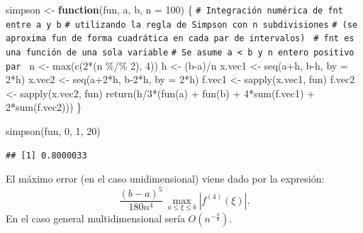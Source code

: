 \documentclass[
]{book}
\newenvironment{Shaded}{\begin{snugshade}}{\end{snugshade}}
\newcommand{\AttributeTok}[1]{\textcolor[rgb]{0.77,0.63,0.00}{#1}}
\newcommand{\CommentTok}[1]{\textcolor[rgb]{0.56,0.35,0.01}{\textit{#1}}}
\newcommand{\ControlFlowTok}[1]{\textcolor[rgb]{0.13,0.29,0.53}{\textbf{#1}}}
\newcommand{\DecValTok}[1]{\textcolor[rgb]{0.00,0.00,0.81}{#1}}
\newcommand{\FunctionTok}[1]{\textcolor[rgb]{0.00,0.00,0.00}{#1}}
\newcommand{\NormalTok}[1]{#1}
\newcommand{\OtherTok}[1]{\textcolor[rgb]{0.56,0.35,0.01}{#1}}
\newcommand{\SpecialCharTok}[1]{\textcolor[rgb]{0.00,0.00,0.00}{#1}}
\theoremstyle{break}
\theoremstyle{nonumberplain}
\renewcommand{\CommentTok}[1]{\textcolor[rgb]{0.41,0.41,0.41}{\texttt{#1}}}
\begin{document}
\begin{Shaded}
\begin{Highlighting}[]
\NormalTok{simpson }\OtherTok{\textless{}{-}} \ControlFlowTok{function}\NormalTok{(fun, a, b, }\AttributeTok{n =} \DecValTok{100}\NormalTok{) \{ }
\CommentTok{\# Integración numérica de fnt entre a y b}
\CommentTok{\# utilizando la regla de Simpson con n subdivisiones}
\CommentTok{\# (se aproxima fun de forma cuadrática en cada par de intervalos)  }
\CommentTok{\# fnt es una función de una sola variable}
\CommentTok{\# Se asume a \textless{} b y n entero positivo par }
\NormalTok{  n }\OtherTok{\textless{}{-}} \FunctionTok{max}\NormalTok{(}\FunctionTok{c}\NormalTok{(}\DecValTok{2}\SpecialCharTok{*}\NormalTok{(n }\SpecialCharTok{\%/\%} \DecValTok{2}\NormalTok{), }\DecValTok{4}\NormalTok{))}
\NormalTok{  h }\OtherTok{\textless{}{-}}\NormalTok{ (b}\SpecialCharTok{{-}}\NormalTok{a)}\SpecialCharTok{/}\NormalTok{n}
\NormalTok{  x.vec1 }\OtherTok{\textless{}{-}} \FunctionTok{seq}\NormalTok{(a}\SpecialCharTok{+}\NormalTok{h, b}\SpecialCharTok{{-}}\NormalTok{h, }\AttributeTok{by =} \DecValTok{2}\SpecialCharTok{*}\NormalTok{h)}
\NormalTok{  x.vec2 }\OtherTok{\textless{}{-}} \FunctionTok{seq}\NormalTok{(a}\SpecialCharTok{+}\DecValTok{2}\SpecialCharTok{*}\NormalTok{h, b}\DecValTok{{-}2}\SpecialCharTok{*}\NormalTok{h, }\AttributeTok{by =} \DecValTok{2}\SpecialCharTok{*}\NormalTok{h)}
\NormalTok{  f.vec1 }\OtherTok{\textless{}{-}} \FunctionTok{sapply}\NormalTok{(x.vec1, fun)}
\NormalTok{  f.vec2 }\OtherTok{\textless{}{-}} \FunctionTok{sapply}\NormalTok{(x.vec2, fun)}
  \FunctionTok{return}\NormalTok{(h}\SpecialCharTok{/}\DecValTok{3}\SpecialCharTok{*}\NormalTok{(}\FunctionTok{fun}\NormalTok{(a) }\SpecialCharTok{+} \FunctionTok{fun}\NormalTok{(b) }\SpecialCharTok{+} \DecValTok{4}\SpecialCharTok{*}\FunctionTok{sum}\NormalTok{(f.vec1) }\SpecialCharTok{+} \DecValTok{2}\SpecialCharTok{*}\FunctionTok{sum}\NormalTok{(f.vec2)))}
\NormalTok{\}}

\FunctionTok{simpson}\NormalTok{(fun, }\DecValTok{0}\NormalTok{, }\DecValTok{1}\NormalTok{, }\DecValTok{20}\NormalTok{)}
\end{Highlighting}
\end{Shaded}

\begin{verbatim}
## [1] 0.8000033
\end{verbatim}

El máximo error (en el caso unidimensional) viene dado por la expresión:
\[\frac{(b-a)^5}{180n^4}\,\max_{a\leq \xi \leq b}\left| f^{(4)}(\xi) \right|.\]
En el caso general multidimensional sería \(O(n^{-\frac{4}{d}})\).
\end{document}
